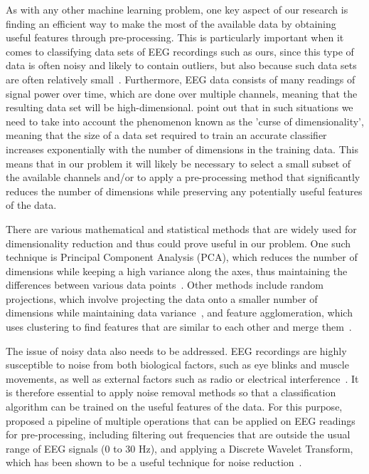\documentclass{mprop}
\begin{document}
As with any other machine learning problem, one key aspect of our research is finding an efficient way to make the most of the available data by obtaining useful features through pre-processing. This is particularly important when it comes to classifying data sets of EEG recordings such as ours, since this type of data is often noisy and likely to contain outliers, but also because such data sets are often relatively small~\cite{lotte_review_2007}. Furthermore, EEG data consists of many readings of signal power over time, which are done over multiple channels, meaning that the resulting data set will be high-dimensional. \citet{lotte_review_2007} point out that in such situations we need to take into account the phenomenon known as the 'curse of dimensionality', meaning that the size of a data set required to train an accurate classifier increases exponentially with the number of dimensions in the training data. This means that in our problem it will likely be necessary to select a small subset of the available channels and/or to apply a pre-processing method that significantly reduces the number of dimensions while preserving any potentially useful features of the data.

There are various mathematical and statistical methods that are widely used for dimensionality reduction and thus could prove useful in our problem. One such technique is Principal Component Analysis (PCA), which reduces the number of dimensions while keeping a high variance along the axes, thus maintaining the differences between various data points~\cite{wold_principal_1987,kumar_understanding_2018}. Other methods include random projections, which involve projecting the data onto a smaller number of dimensions while maintaining data variance~\cite{bingham_random_2001}, and feature agglomeration, which uses clustering to find features that are similar to each other and merge them~\cite{wang_towards_2018}.

The issue of noisy data also needs to be addressed. EEG recordings are highly susceptible to noise from both biological factors, such as eye blinks and muscle movements, as well as external factors such as radio or electrical interference~\cite{fitzgibbon_removal_2007}. It is therefore essential to apply noise removal methods so that a classification algorithm can be trained on the useful features of the data. For this purpose, \citet{shaker_eeg_2007} proposed a pipeline of multiple operations that can be applied on EEG readings for pre-processing, including filtering out frequencies that are outside the usual range of EEG signals (0 to 30 Hz), and applying a Discrete Wavelet Transform, which has been shown to be a useful technique for noise reduction~\cite{lang_noise_1996,lang_nonlinear_1995}.
\end{document}
